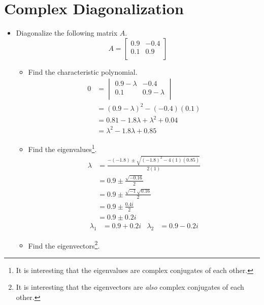 \documentclass{article}
\begin{document}
\section*{Complex Diagonalization}
\begin{itemize}
    \item {}Diagonalize the following matrix $A$.
    \begin{equation*}
        A =
        \begin{bmatrix}
            0.9 & -0.4\\
            0.1 & 0.9\\
        \end{bmatrix}
    \end{equation*}
    \begin{itemize}
        \item Find the characteristic polynomial.
        \begin{align*}
            0 &=
            \begin{vmatrix}
                0.9-\lambda & -0.4\\
                0.1 & 0.9-\lambda\\
            \end{vmatrix}\\
            &= (0.9-\lambda)^2-(-0.4)(0.1)\\
            &= 0.81-1.8\lambda+\lambda^2+0.04\\
            &= \lambda^2-1.8\lambda+0.85
        \end{align*}
        \item Find the eigenvalues\footnote{It is interesting that the eigenvalues are complex conjugates of each other.}.
        \begin{align*}
            \lambda &= \frac{-(-1.8)\pm\sqrt{(-1.8)^2-4(1)(0.85)}}{2(1)}\\
            &= 0.9\pm\frac{\sqrt{-0.16}}{2}\\
            &= 0.9\pm\frac{\sqrt{-1}\sqrt{0.16}}{2}\\
            &= 0.9\pm\frac{0.4i}{2}\\
            &= 0.9\pm 0.2i
        \end{align*}
        \begin{align*}
            \lambda_1 &= 0.9+0.2i&
                \lambda_2 &= 0.9-0.2i
        \end{align*}
        \item Find the eigenvectors\footnote{It is interesting that the eigenvectors are \emph{also} complex conjugates of each other.}.

\end{itemize}
\end{itemize}
\end{document}
